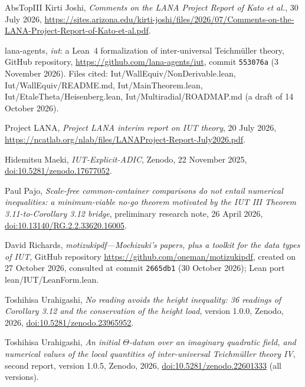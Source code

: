 \documentclass[11pt,a4paper]{article}
\newcommand{\leanus}{\textunderscore\allowbreak}
\newcommand{\lean}[1]{{\ttfamily\let\_\leanus #1}}
\begin{document}
\begin{thebibliography}{AbsTopIII}
Kirti Joshi, \emph{Comments on the LANA Project Report of Kato et al.}, 30 July 2026,
\url{https://sites.arizona.edu/kirti-joshi/files/2026/07/Comments-on-the-LANA-Project-Report-of-Kato-et-al.pdf}.

lana-agents, \emph{iut}: a Lean~4 formalization of inter-universal {T}eichm\"uller theory, GitHub repository,
\url{https://github.com/lana-agents/iut}, commit \texttt{553076a} (3 November 2026). Files cited:
\lean{Iut/\allowbreak{}WallEquiv/\allowbreak{}NonDerivable.lean}, \lean{Iut/\allowbreak{}WallEquiv/\allowbreak{}README.md}, \lean{Iut/\allowbreak{}MainTheorem.lean},
\lean{Iut/\allowbreak{}EtaleTheta/\allowbreak{}Heisenberg.lean}, \lean{Iut/\allowbreak{}Multiradial/\allowbreak{}ROADMAP.md} (a draft of 14 October 2026).

Project LANA, \emph{Project LANA interim report on IUT theory}, 20 July 2026,
\url{https://ncatlab.org/nlab/files/LANAProject-Report-July2026.pdf}.

Hidemitsu Maeki, \emph{IUT-Explicit-ADIC}, Zenodo, 22 November 2025,
\href{https://doi.org/10.5281/zenodo.17677052}{doi:10.5281/zenodo.17677052}.

Paul Pajo, \emph{Scale-free common-container comparisons do not entail numerical inequalities: a minimum-viable no-go
theorem motivated by the {IUT} {III} {T}heorem 3.11-to-{C}orollary 3.12 bridge}, preliminary research note,
26 April 2026, \href{https://doi.org/10.13140/RG.2.2.33620.16005}{doi:10.13140/RG.2.2.33620.16005}.

David Richards, \emph{motizukipdf---{M}ochizuki's papers, plus a toolkit for the data types of {IUT}}, GitHub
repository \url{https://github.com/oneman/motizukipdf}, created on 27 October 2026, consulted at commit \texttt{2665db1}
(30 October 2026); Lean port \lean{lean/IUT/LeanForm.lean}.

Toshihisa Urahigashi, \emph{No reading avoids the height inequality: 36 readings of Corollary 3.12 and the conservation
of the height load}, version 1.0.0, Zenodo, 2026,
\href{https://doi.org/10.5281/zenodo.23965952}{doi:10.5281/zenodo.23965952}.

Toshihisa Urahigashi, \emph{An initial $\Theta$-datum over an imaginary quadratic field, and numerical values of the
local quantities of inter-universal {T}eichm\"uller theory {IV}}, second report, version 1.0.5, Zenodo, 2026,
\href{https://doi.org/10.5281/zenodo.22601333}{doi:10.5281/zenodo.22601333} (all versions).


\end{thebibliography}
\end{document}
